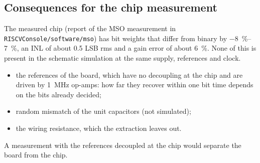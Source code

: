 \subsection{Consequences for the chip measurement}
The measured chip (report of the MSO measurement in \texttt{RISCVConsole/software/mso}) has bit
weights that differ from binary by \SIrange{-8}{7}{\percent}, an INL of about \num{0.5} LSB rms and a
gain error of about \SI{6}{\percent}. None of this is present in the schematic simulation at the same
supply, references and clock.
\begin{itemize}
  \item the references of the board, which have no decoupling at the chip and are driven by
        \SI{1}{MHz} op-amps: how far they recover within one bit time depends on the bits already decided;
  \item random mismatch of the unit capacitors (not simulated);
  \item the wiring resistance, which the extraction leaves out.
\end{itemize}
A measurement with the references decoupled at the chip would separate the board from the chip.

